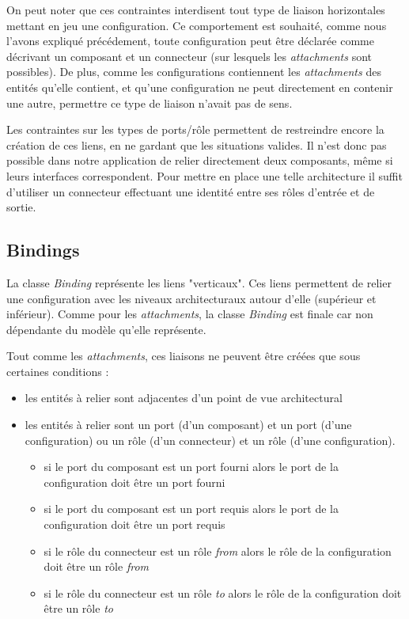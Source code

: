             On peut noter que ces contraintes interdisent tout type de liaison horizontales mettant en jeu une configuration. Ce comportement est souhaité, comme nous l'avons expliqué précédement, toute configuration peut être déclarée comme décrivant un composant et un connecteur (sur lesquels les \emph{attachments} sont possibles). De plus, comme les configurations contiennent les \emph{attachments} des entités qu'elle contient, et qu'une configuration ne peut directement en contenir une autre, permettre ce type de liaison n'avait pas de sens.
            \newline
            
            Les contraintes sur les types de ports/rôle permettent de restreindre encore la création de ces liens, en ne gardant que les situations valides. Il n'est donc pas possible dans notre application de relier directement deux composants, même si leurs interfaces correspondent. Pour mettre en place une telle architecture il suffit d'utiliser un connecteur effectuant une identité entre ses rôles d'entrée et de sortie.
            
		\subsection{Bindings}
        	La classe \emph{Binding} représente les liens "verticaux". Ces liens permettent de relier une configuration avec les niveaux architecturaux autour d'elle (supérieur et inférieur). Comme pour les \emph{attachments}, la classe \emph{Binding} est finale car non dépendante du modèle qu'elle représente.
            \newline
            
            Tout comme les \emph{attachments}, ces liaisons ne peuvent être créées que sous certaines conditions :
            \begin{itemize}
            	\item les entités à relier sont adjacentes d'un point de vue architectural
                \item les entités à relier sont un port (d'un composant) et un port (d'une configuration) ou un rôle (d'un connecteur) et un rôle (d'une configuration).
                \begin{itemize}
                  \item si le port du composant est un port fourni alors le port de la configuration doit être un port fourni
                  \item si le port du composant est un port requis alors le port de la configuration doit être un port requis
                  \item si le rôle du connecteur est un rôle \emph{from} alors le rôle de la configuration doit être un rôle \emph{from}
                  \item si le rôle du connecteur est un rôle \emph{to} alors le rôle de la configuration doit être un rôle \emph{to}
                \end{itemize}
            \end{itemize}
            ~\\
            
